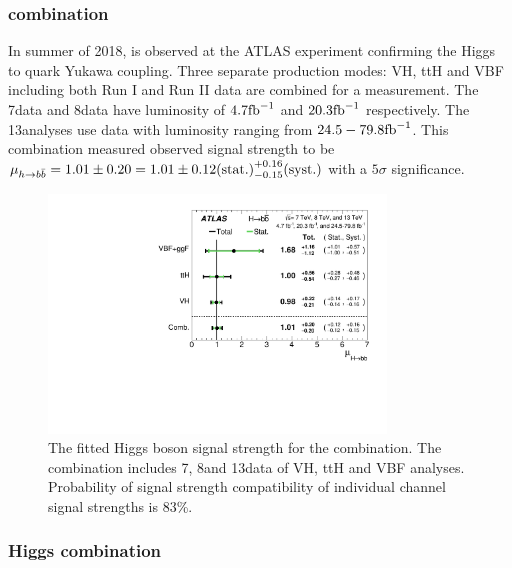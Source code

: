 \subsubsection{\Hbb combination}

In summer of 2018, \Hbb is observed at the ATLAS experiment \cite{VHPaper} confirming the Higgs to quark Yukawa coupling. Three separate \Hbb production modes: VH, ttH and VBF including both Run I and Run II data are combined for a measurement. The 7\TeV data and 8\TeV data have luminosity of $4.7\rm{fb}^{-1}$ and $20.3\rm{fb}^{-1}$ respectively. The 13\TeV analyses use data with luminosity ranging from $24.5-79.8\rm{fb}^{-1}$. This combination measured observed signal strength to be $\mu_{h \rightarrow b\bar{b}}= 1.01 \pm 0.20 = 1.01 \pm 0.12\text{(stat.)}^{+0.16}_{-0.15}\text{(syst.)}$ with a $5\sigma$ significance.


\begin{figure}[htbp]
  \centering
 \includegraphics[width=0.8\textwidth]{figures/VBF/HbbComb.pdf}
 \caption{The fitted Higgs boson signal strength for the \Hbb combination. The combination includes 7\TeV, 8\TeV and 13\TeV data of VH, ttH and VBF analyses. Probability of signal strength compatibility of individual channel signal strengths is 83\%.}
  \label{fig:vbf-combination-hbb}
\end{figure}



\subsubsection{Higgs combination}
